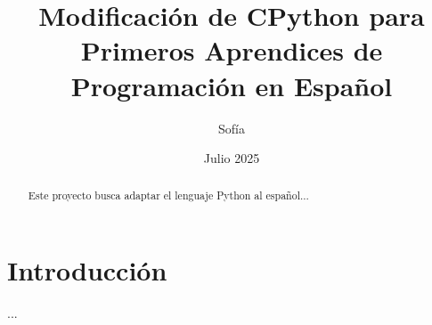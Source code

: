 \documentclass[12pt]{article}
\title{Modificación de CPython para Primeros Aprendices de Programación en Español}
\author{Sofía}
\date{Julio 2025}
\begin{document}
\maketitle

\begin{abstract}
Este proyecto busca adaptar el lenguaje Python al español...
\end{abstract}

\section{Introducción}

...
\end{document}
